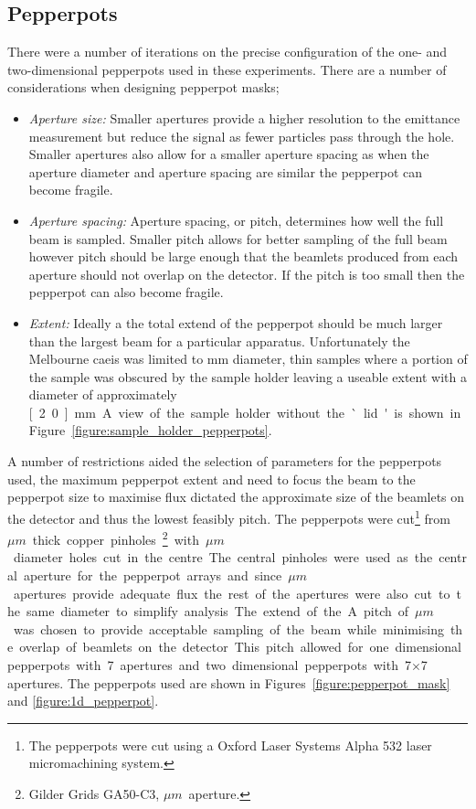 \subsection{Pepperpots}
There were a number of iterations on the precise configuration of the one- and two-dimensional pepperpots used in these experiments.
There are a number of considerations when designing pepperpot masks;
\begin{itemize}
    \item{\emph{Aperture size:} Smaller apertures provide a higher resolution to the emittance measurement but reduce the signal as fewer particles pass through the hole.
    Smaller apertures also allow for a smaller aperture spacing as when the aperture diameter and aperture spacing are similar the pepperpot can become fragile.}
    \item{\emph{Aperture spacing:} Aperture spacing, or pitch, determines how well the full beam is sampled.
    Smaller pitch allows for better sampling of the full beam however pitch should be large enough that the beamlets produced from each aperture should not overlap on the detector.
    If the pitch is too small then the pepperpot can also become fragile.}
    \item{\emph{Extent:} Ideally a the total extend of the pepperpot should be much larger than the largest beam for a particular apparatus.
    Unfortunately the Melbourne \gls{caeis} was limited to \unit[3]{mm} diameter, thin samples where a portion of the sample was obscured by the sample holder leaving a useable extent with a diameter of approximately \unit[2.0]{mm}. A view of the sample holder without the `lid' is shown in Figure~\ref{figure:sample_holder_pepperpots}.}
\end{itemize}

A number of restrictions aided the selection of parameters for the pepperpots used, the maximum pepperpot extent and need to focus the beam to the pepperpot size to maximise flux dictated the approximate size of the beamlets on the detector and thus the lowest feasibly pitch.
The pepperpots were cut\footnote{The pepperpots were cut using a Oxford Laser Systems Alpha 532 laser micromachining system.} from \unit[25]{$\mu m$} thick copper pinholes\footnote{Gilder Grids GA50-C3, \unit[50]{$\mu m$} aperture.} with \unit[50]{$\mu m$} diameter holes cut in the centre.
The central pinholes were used as the central aperture for the pepperpot arrays and since \unit[50]{$\mu m$} apertures provide adequate flux the rest of the apertures were also cut to the same diameter to simplify analysis.
The extend of the 
A pitch of \unit[700]{$\mu m$} was chosen to provide acceptable sampling of the beam while minimising the overlap of beamlets on the detector.
This pitch allowed for one dimensional pepperpots with 7 apertures and two dimensional pepperpots with 7$\times$7 apertures.
The pepperpots used are shown in Figures~\ref{figure:pepperpot_mask} and \ref{figure:1d_pepperpot}.


